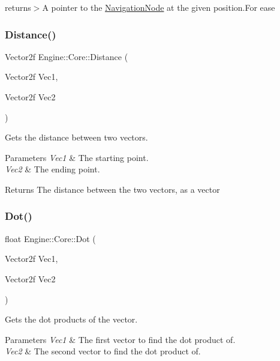 returns$>$A pointer to the \hyperlink{struct_engine_1_1_core_1_1_navigation_node}{Navigation\+Node} at the given position.For ease \mbox{\label{namespace_engine_1_1_core_a168a564b1bf2d0949b409aa78ed292f2}} 
\subsubsection{\texorpdfstring{Distance()}{Distance()}}
{\footnotesize\ttfamily Vector2f Engine\+::\+Core\+::\+Distance (\begin{DoxyParamCaption}\item[{Vector2f}]{Vec1,  }\item[{Vector2f}]{Vec2 }\end{DoxyParamCaption})}



Gets the distance between two vectors. 


\begin{DoxyParams}{Parameters}
{\em Vec1} & The starting point.\\
\hline
{\em Vec2} & The ending point.\\
\hline
\end{DoxyParams}
\begin{DoxyReturn}{Returns}
The distance between the two vectors, as a vector
\end{DoxyReturn}
\mbox{\label{namespace_engine_1_1_core_a72cfe6298618c9023d217b9ab03664ee}} 
\subsubsection{\texorpdfstring{Dot()}{Dot()}}
{\footnotesize\ttfamily float Engine\+::\+Core\+::\+Dot (\begin{DoxyParamCaption}\item[{Vector2f}]{Vec1,  }\item[{Vector2f}]{Vec2 }\end{DoxyParamCaption})}



Gets the dot products of the vector. 


\begin{DoxyParams}{Parameters}
{\em Vec1} & The first vector to find the dot product of.\\
\hline
{\em Vec2} & The second vector to find the dot product of.\\
\hline
\end{DoxyParams}
\mbox{\label{namespace_engine_1_1_core_a0a9fabc0b4dac04e7f2871a2ce13d795}} 
